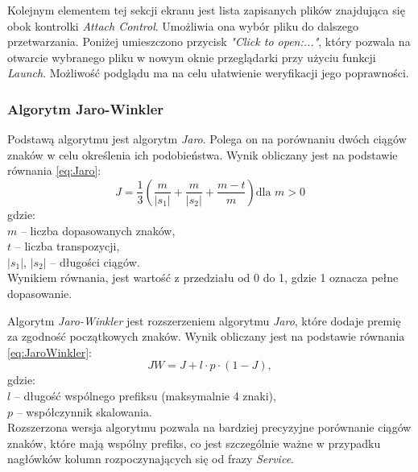 Kolejnym elementem tej sekcji ekranu jest lista zapisanych plików znajdująca się obok kontrolki \emph{Attach Control}. Umożliwia ona wybór pliku do dalszego przetwarzania. Poniżej umieszczono przycisk \emph{"Click to open:..."}, który pozwala na otwarcie wybranego pliku w nowym oknie przeglądarki przy użyciu funkcji \emph{Launch}. Możliwość podglądu ma na celu ułatwienie weryfikacji jego poprawności.

\subsubsection*{Algorytm Jaro-Winkler \cite{noauthor_jarowinkler_2024,vaid_comprehensive_2023}}
Podstawą algorytmu jest algorytm \emph{Jaro}. Polega on na porównaniu dwóch ciągów znaków w celu określenia ich podobieństwa. Wynik obliczany jest na podstawie równania \ref{eq:Jaro}:
\begin{equation}
    \label{eq:Jaro}
    J = \frac{1}{3} \left( \frac{m}{|s_1|} + \frac{m}{|s_2|} + \frac{m - t}{m} \right) \mbox{dla } m>0
\end{equation}
\noindent gdzie:\\
$m$ – liczba dopasowanych znaków,\\    $t$ – liczba transpozycji,\\    $|s_1|$, $|s_2|$ – długości ciągów.\\

\noindent Wynikiem równania, jest wartość z przedziału od 0 do 1, gdzie 1 oznacza pełne dopasowanie.

Algorytm \emph{Jaro-Winkler} jest rozszerzeniem algorytmu \emph{Jaro}, które dodaje premię za zgodność początkowych znaków. Wynik obliczany jest na podstawie równania \ref{eq:JaroWinkler}:
\begin{equation}
    \label{eq:JaroWinkler}
    JW = J + l \cdot p \cdot (1 - J),
\end{equation}
gdzie:\\
$l$ – długość wspólnego prefiksu (maksymalnie 4 znaki),\\ $p$ – współczynnik skalowania.\\

\noindent Rozszerzona wersja algorytmu pozwala na bardziej precyzyjne porównanie ciągów znaków, które mają wspólny prefiks, co jest szczególnie ważne w przypadku nagłówków kolumn rozpoczynających się od frazy \emph{Service}.


\vspace{1cm}



